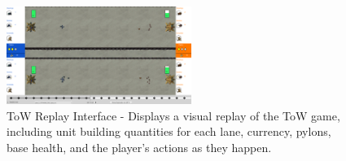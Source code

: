 \documentclass{article}
\begin{document}
%
%

\begin{figure}[tp]
    \centering
    \includegraphics[width=6cm]{img/ui/replayUI.PNG}
    \caption{ToW Replay Interface - Displays a visual replay of the ToW game, including unit building quantities for each lane, currency, pylons, base health, and the player's actions as they happen.}
    \label{fig:ToW-tree-Ui}
\end{figure}

\end{document}

